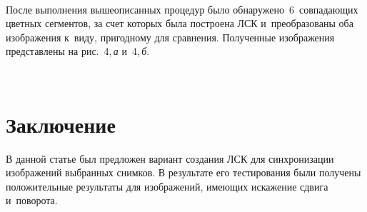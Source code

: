 \begin{multicols}{2}
\begin{figure*} %
\vspace*{1pt}
 \begin{center}  
\mbox{%
 \epsfxsize=156.304mm
 }
\end{center} 
\vspace*{-9pt}
  \end{figure*}
  
  После выполнения вышеописанных процедур было 
обнаружено~6~совпадающих цветных сегментов, за счет которых была 
построена ЛСК и~преобразованы оба изображения к~виду, пригодному для 
сравнения. Полученные изображения пред\-став\-ле\-ны на
рис.~4,\,\textit{а} и~4,\,\textit{б}.
  
  \begin{figure*} %
  \vspace*{1pt}
 \begin{center}  
\mbox{%
 \epsfxsize=162.337mm
 }
\end{center} 
\vspace*{-9pt}
  \end{figure*}
  
  \vspace*{-12pt}
     
  \section{Заключение}
  
  В данной статье был предложен вариант создания 
ЛСК для синхронизации изображений выбранных снимков.
  В результате его тестирования были получены положительные результаты 
для изображений, имеющих искажение сдвига и~поворота. 
  
{\small\frenchspacing
 {%
 \begin{thebibliography}{9}



\end{thebibliography}}}
\end{multicols}
